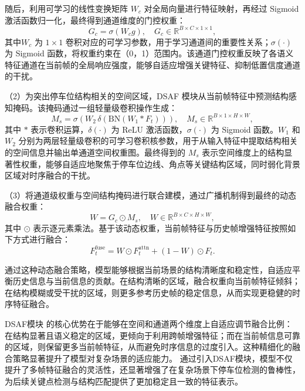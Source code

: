 随后，利用可学习的线性变换矩阵 \(W_c\) 对全局向量进行特征映射，再经过 Sigmoid 激活函数归一化，最终得到通道维度的门控权重：
\begin{equation}
G_c = \sigma\!\left( W_c g \right),
\quad
G_c \in \mathbb{R}^{B \times C \times 1 \times 1},
\end{equation}
其中\(W_c\) 为 $1 \times 1$ 卷积对应的可学习参数，用于学习通道间的重要性关系；\(\sigma(\cdot)\) 为 Sigmoid 函数，将权重约束在（0，1）范围内。该通道门控权重反映了各语义特征通道在当前帧的全局响应强度，能够自适应增强关键特征、抑制低置信度通道的干扰。



（2）为突出停车位结构相关的空间区域，DSAF 模块从当前帧特征中预测结构感知掩码。该掩码通过一组轻量级卷积操作生成：
\begin{equation}
M_s = \sigma\!\left( W_2 \, \delta \!\left( \text{BN}( W_1 * F_t ) \right) \right),
\quad
M_s \in \mathbb{R}^{B \times 1 \times H \times W},
\end{equation}
其中 \( * \) 表示卷积运算，\(\delta(\cdot)\) 为 ReLU 激活函数，\(\sigma(\cdot)\) 为 Sigmoid 函数。\(W_1\) 和 \(W_2\) 分别为两层轻量级卷积的可学习卷积核参数，用于从输入特征中提取结构相关的空间信息并输出单通道空间权重图。最终得到的 \(M_s\) 表示空间维度上的结构显著性权重，能够自适应地聚焦于停车位边线、角点等关键结构区域，同时弱化背景区域对时序融合的干扰。


（3）将通道级权重与空间结构掩码进行联合建模，通过广播机制得到最终的动态融合权重：
\begin{equation}
W = G_c \odot M_s,
\quad
W \in \mathbb{R}^{B \times C \times H \times W},
\end{equation}
其中 $\odot$ 表示逐元素乘法。基于该动态权重，当前帧特征与历史帧增强特征按照如下方式进行融合：
\begin{equation}
F_{t}^{\mathrm{fuse}} =
W \odot F_{t}^{\text{attn}}
+ \left( 1 - W \right) \odot F_t.
\end{equation}

通过这种动态融合策略，模型能够根据当前场景的结构清晰度和稳定性，自适应平衡历史信息与当前信息的贡献。在结构清晰的区域，融合权重向当前帧特征倾斜；在结构模糊或受干扰的区域，则更多参考历史帧的稳定信息，从而实现更稳健的时序特征融合。

DSAF模块 的核心优势在于能够在空间和通道两个维度上自适应调节融合比例：在结构显著且语义稳定的区域，更倾向于利用跨帧增强特征；而在当前帧信息可靠的区域，则保留更多当前帧特征，从而避免时序信息的过度引入。这种精细化的融合策略显著提升了模型对复杂场景的适应能力。
通过引入DSAF模块，模型不仅提升了多帧特征融合的灵活性，还显著增强了在复杂场景下停车位检测的鲁棒性，为后续关键点检测与结构匹配提供了更加稳定且一致的特征表示。




